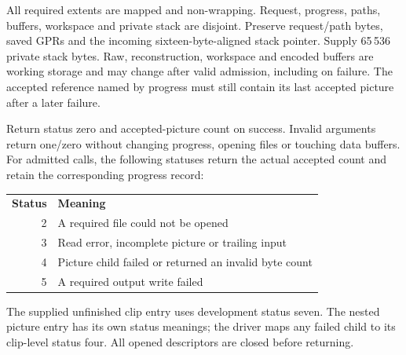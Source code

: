 All required extents are mapped and non-wrapping. Request, progress, paths,
buffers, workspace and private stack are disjoint. Preserve request/path bytes,
saved GPRs and the incoming sixteen-byte-aligned stack pointer. Supply 65\,536
private stack bytes. Raw, reconstruction, workspace and encoded buffers are
working storage and may change after valid admission, including on failure.
The accepted reference named by progress must still contain its last accepted
picture after a later failure.

Return status zero and accepted-picture count on success. Invalid arguments
return one/zero without changing progress, opening files or touching data buffers.
For admitted calls, the following statuses return the actual accepted count and
retain the corresponding progress record:
\begin{center}
  \begin{tabular}{rl}
    \textbf{Status} & \textbf{Meaning}                                       \\
    2               & A required file could not be opened                    \\
    3               & Read error, incomplete picture or trailing input       \\
    4               & Picture child failed or returned an invalid byte count \\
    5               & A required output write failed
  \end{tabular}
\end{center}
The supplied unfinished clip entry uses development status seven. The nested
picture entry has its own status meanings; the driver maps any failed child to
its clip-level status four. All opened descriptors are closed before returning.

